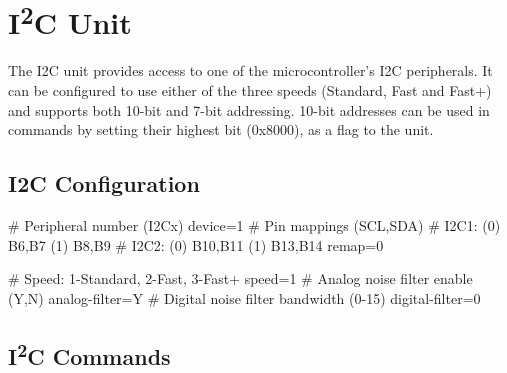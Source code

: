 \section{I\textsuperscript{2}C Unit}

The \gls{I2C} unit provides access to one of the microcontroller's \gls{I2C} peripherals. It can be configured to use either of the three speeds (Standard, Fast and Fast+) and supports both 10-bit and 7-bit addressing. 10-bit addresses can be used in commands by setting their highest bit (0x8000), as a flag to the unit.

\subsection{I2C Configuration}

\begin{inicode}
[I2C:d@4]
# Peripheral number (I2Cx)
device=1
# Pin mappings (SCL,SDA)
#  I2C1: (0) B6,B7    (1) B8,B9
#  I2C2: (0) B10,B11  (1) B13,B14
remap=0

# Speed: 1-Standard, 2-Fast, 3-Fast+
speed=1
# Analog noise filter enable (Y,N)
analog-filter=Y
# Digital noise filter bandwidth (0-15)
digital-filter=0
\end{inicode}

\subsection{I\textsuperscript{2}C Commands}

